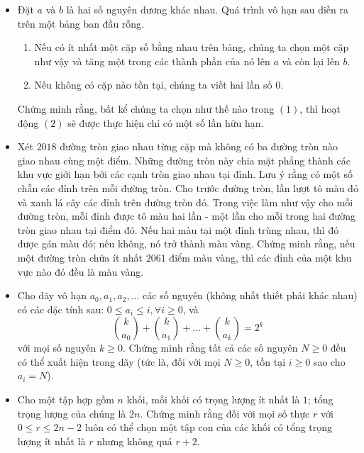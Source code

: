 \documentclass[11pt]{scrartcl}
\begin{document}
\begin{itemize}[label=, leftmargin=0em, itemsep=-0em]
    \item \begin{btvn}
        Đặt $a$ và $b$ là hai số nguyên dương khác nhau. Quá trình vô hạn sau diễn ra trên một bảng ban đầu rỗng.
        \begin{enumerate}
            \item Nếu có ít nhất một cặp số bằng nhau trên bảng, chúng ta chọn một cặp như vậy và tăng một trong các thành phần của nó lên $a$ và còn lại lên $b$.
            \item Nếu không có cặp nào tồn tại, chúng ta viết hai lần số $0$.
        \end{enumerate}
        Chứng minh rằng, bất kể chúng ta chọn như thế nào trong $(1)$, thì hoạt động $(2)$ sẽ được thực hiện chỉ có một số lần hữu hạn.
    \end{btvn}

    \item \begin{btvn}
        Xét $2018$ đường tròn giao nhau từng cặp mà không có ba đường tròn nào giao nhau cùng một điểm. Những đường tròn này chia mặt phẳng thành các khu vực giới hạn bởi các cạnh tròn giao nhau tại đỉnh. Lưu ý rằng có một số chẵn các đỉnh trên mỗi đường tròn. Cho trước đường tròn, lần lượt tô màu đỏ và xanh lá cây các đỉnh trên đường tròn đó. Trong việc làm như vậy cho mỗi đường tròn, mỗi đỉnh được tô màu hai lần - một lần cho mỗi trong hai đường tròn giao nhau tại điểm đó. Nếu hai màu tại một đỉnh trùng nhau, thì đó được gán màu đó; nếu không, nó trở thành màu vàng. Chứng minh rằng, nếu một đường tròn chứa ít nhất $2061$ điểm màu vàng, thì các đỉnh của một khu vực nào đó đều là màu vàng.
    \end{btvn}

    \item \begin{btvn}
        Cho dãy vô hạn $a_0,a _1, a_2, \dots$ các số nguyên (không nhất thiết phải khác nhau) có các đặc tính sau: $0\le a_i \le i, \forall i\ge 0$, và
        \[\binom{k}{a_0} + \binom{k}{a_1} + \dots + \binom{k}{a_k} = 2^k\]
        với mọi số nguyên $k\ge 0$. Chứng minh rằng tất cả các số nguyên $N\ge 0$ đều có thể xuất hiện trong dãy (tức là, đối với mọi $N\ge 0$, tồn tại $i\ge 0$ sao cho $a_i=N$).
    \end{btvn}

    \item \begin{btvn}
        Cho một tập hợp gồm $n$ khối, mỗi khối có trọng lượng ít nhất là $1$; tổng trọng lượng của chúng là $2n$. Chứng minh rằng đối với mọi số thực $r$ với $0 \leq r \leq 2n-2$ luôn có thể chọn một tập con của các khối có tổng trọng lượng ít nhất là $r$ nhưng không quá $r + 2$.
    \end{btvn}


\end{itemize}
\end{document}
